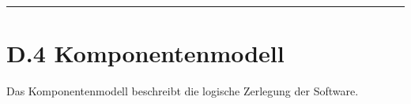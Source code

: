 \documentclass[
  a4paper,
  12pt,
  DIV=12,        %
  parskip=half,  %
  headings=small %
]{scrartcl}
\theoremstyle{definition}
\theoremstyle{definition}
\newenvironment{Shaded}{\begin{snugshade}}{\end{snugshade}}
\begin{document}
\begin{center}\rule{0.5\linewidth}{0.5pt}\end{center}

\section{D.4 Komponentenmodell}\label{d.4-komponentenmodell}

Das Komponentenmodell beschreibt die logische Zerlegung der Software.


\end{document}
